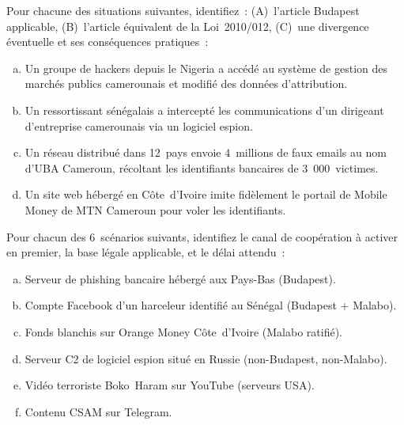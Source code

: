 \bigskip

\begin{boxexo}[title={\ding{45}\quad Exercice~10.1. Qualification internationale \niveaubase}]
Pour chacune des situations suivantes, identifiez~: (A)~l'article Budapest
applicable, (B)~l'article équivalent de la Loi~2010/012, (C)~une divergence
éventuelle et ses conséquences pratiques~:
\begin{enumerate}[(a)]
    \item Un groupe de hackers depuis le Nigeria a accédé au système de
          gestion des marchés publics camerounais et modifié des données
          d'attribution.
    \item Un ressortissant sénégalais a intercepté les communications
          d'un dirigeant d'entreprise camerounais via un logiciel espion.
    \item Un réseau distribué dans 12~pays envoie 4~millions de faux
          emails au nom d'UBA Cameroun, récoltant les identifiants
          bancaires de 3~000~victimes.
    \item Un site web hébergé en Côte~d'Ivoire imite fidèlement le portail
          de Mobile Money de MTN Cameroun pour voler les identifiants.
\end{enumerate}
\end{boxexo}

\begin{boxexo}[title={\ding{45}\quad Exercice~10.2. Choix de canal \niveaumoyen}]
Pour chacun des 6~scénarios suivants, identifiez le canal de coopération
à activer en premier, la base légale applicable, et le délai attendu~:
\begin{enumerate}[(a)]
    \item Serveur de phishing bancaire hébergé aux Pays-Bas (Budapest).
    \item Compte Facebook d'un harceleur identifié au Sénégal
          (Budapest + Malabo).
    \item Fonds blanchis sur Orange Money Côte~d'Ivoire (Malabo ratifié).
    \item Serveur C2 de logiciel espion situé en Russie
          (non-Budapest, non-Malabo).
    \item Vidéo terroriste Boko~Haram sur YouTube (serveurs USA).
    \item Contenu CSAM sur Telegram.
\end{enumerate}
\end{boxexo}

